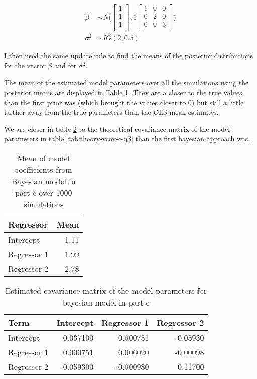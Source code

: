 \documentclass[]{book}
\begin{document}
\begin{align}
  \beta &\sim N \bigg( 
  \begin{bmatrix}
  1\\
  1\\
  1\\
  \end{bmatrix},
  1 \begin{bmatrix}
  1 & 0 & 0\\
  0 & 2 & 0\\
  0 & 0 & 3\\
  \end{bmatrix} \bigg)\\
  \sigma^2 &\sim IG(2, 0.5)
\end{align}

I then used the same update rule to find the means of the posterior distributions for the vector \(\beta\) and for \(\sigma^2\).

The mean of the estimated model parameters over all the simulations using the posterior means are displayed in Table \ref{tab:bayes-c-mean-coefs-q3}. They are a closer to the true values than the first prior was (which brought the values closer to 0) but still a little farther away from the true parameters than the OLS mean estimates.

We are closer in table \ref{tab:bayes-c-est-vcov-q3} to the theoretical covariance matrix of the model parameters in table \ref{tab:theory-vcov-c-q3} than the first bayesian approach was.

\begin{table}

\caption{\label{tab:bayes-c-mean-coefs-q3}Mean of model coefficients from Bayesian model in part c over 1000 simulations}
\centering
\begin{tabular}[t]{lr}
\toprule
Regressor & Mean\\
\midrule
Intercept & 1.11\\
Regressor 1 & 1.99\\
Regressor 2 & 2.78\\
\bottomrule
\end{tabular}
\end{table}

\begin{table}

\caption{\label{tab:bayes-c-est-vcov-q3}Estimated covariance matrix of the model parameters for bayesian model in part c}
\centering
\begin{tabular}[t]{lrrr}
\toprule
Term & Intercept & Regressor 1 & Regressor 2\\
\midrule
Intercept & 0.037100 & 0.000751 & -0.05930\\
Regressor 1 & 0.000751 & 0.006020 & -0.00098\\
Regressor 2 & -0.059300 & -0.000980 & 0.11700\\
\bottomrule
\end{tabular}
\end{table}
\end{document}
